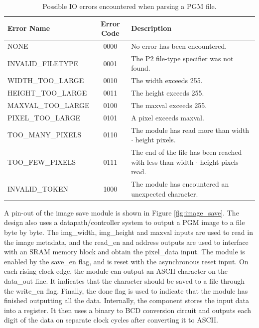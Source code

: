 \documentclass[a4paper, 10pt, titlepage]{article}
\begin{document}
\begin{table}
    \centering
    \begin{tabular}[c]{ l | c | p{8cm} }
        \textbf{Error Name} & \textbf{Error Code} & \textbf{Description} \\
        \hline
        NONE & 0000 & No error has been encountered. \\
        INVALID\_FILETYPE & 0001 & The P2 file-type specifier was not found. \\
        WIDTH\_TOO\_LARGE & 0010 & The width exceeds 255. \\
        HEIGHT\_TOO\_LARGE & 0011 & The height exceeds 255. \\
        MAXVAL\_TOO\_LARGE & 0100 & The maxval exceeds 255. \\
        PIXEL\_TOO\_LARGE & 0101 & A pixel exceeds maxval. \\
        TOO\_MANY\_PIXELS & 0110 & The module has read more than width $\cdot$ height pixels. \\
        TOO\_FEW\_PIXELS & 0111 & The end of the file has been reached with less than width $\cdot$ height pixels read. \\
        INVALID\_TOKEN & 1000 & The module has encountered an unexpected character. \\
    \end{tabular}
    \caption{Possible IO errors encountered when parsing a PGM file.}
    \label{tab:io_error}
\end{table}

A pin-out of the image save module is shown in Figure \ref{fig:image_save}. The design also uses a datapath/controller system to output a PGM image to a file byte by byte. The img\_width, img\_height and maxval inputs are used to read in the image metadata, and the read\_en and address outputs are used to interface with an SRAM memory block and obtain the pixel\_data input. The module is enabled by the save\_en flag, and is reset with the asynchronous reset input. On each rising clock edge, the module can output an ASCII character on the data\_out line. It indicates that the character should be saved to a file through the write\_en flag. Finally, the done flag is used to indicate that the module has finished outputting all the data. Internally, the component stores the input data into a register. It then uses a binary to BCD conversion circuit and outputs each digit of the data on separate clock cycles after converting it to ASCII.
\end{document}
